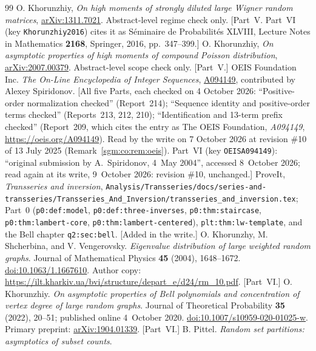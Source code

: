 \documentclass[11pt,letterpaper]{article}
\theoremstyle{remark}\newtheorem{remark}[theorem]{Remark}
\newcommand{\file}[1]{\nolinkurl{#1}}
\theoremstyle{definition}\newtheorem{definition}[theorem]{Definition}
\begin{document}
\begin{thebibliography}{99}
 O. Khorunzhiy, \emph{On high moments of strongly diluted large Wigner random matrices}, \href{https://arxiv.org/abs/1311.7021}{arXiv:1311.7021}. Abstract-level regime check only. [Part~V. Part~VI (key \texttt{Khorunzhiy2016}) cites it as S\'eminaire de Probabilit\'es XLVIII, Lecture Notes in Mathematics \textbf{2168}, Springer, 2016, pp.~347--399.]
 O. Khorunzhiy, \emph{On asymptotic properties of high moments of compound Poisson distribution}, \href{https://arxiv.org/abs/2007.00379}{arXiv:2007.00379}. Abstract-level scope check only. [Part~V.]
 OEIS Foundation Inc.
\emph{The On-Line Encyclopedia of Integer Sequences},
\href{https://oeis.org/A094149}{A094149}, contributed by Alexey Spiridonov.
[All five Parts, each checked on 4 October 2026: ``Positive-order normalization checked'' (Report~214); ``Sequence identity and positive-order terms checked'' (Reports~213, 212, 210); ``Identification and 13-term prefix checked'' (Report~209, which cites the entry as The OEIS Foundation, \emph{A094149}, \url{https://oeis.org/A094149}). Read by the write on 7 October 2026 at revision \#10 of 13 July 2025 (Remark~\ref{sgm:co:rem:oeis}). Part~VI (key \texttt{OEISA094149}): ``original submission by A.~Spiridonov, 4~May 2004'', accessed 8~October 2026; read again at its write, 9~October 2026: revision \#10, unchanged.]
 ProveIt, \emph{Transseries and inversion}, \file{Analysis/Transseries/docs/series-and-transseries/Transseries_And_Inversion/transseries_and_inversion.tex}; Part~0 (\file{p0:def:model}, \file{p0:def:three-inverses}, \file{p0:thm:staircase}, \file{p0:thm:lambert-core}, \file{p0:thm:lambert-centered}), \file{plt:thm:lw-template}, and the Bell chapter \file{q2:sec:bell}. [Added in the write.]
 O. Khorunzhy, M. Shcherbina, and V. Vengerovsky.
\emph{Eigenvalue distribution of large weighted random graphs}.
Journal of Mathematical Physics \textbf{45} (2004), 1648--1672.
\href{https://doi.org/10.1063/1.1667610}{doi:10.1063/1.1667610}.
Author copy: \url{https://ilt.kharkiv.ua/bvi/structure/depart_e/d24/rm_10.pdf}. [Part~VI.]
 O. Khorunzhiy.
\emph{On asymptotic properties of Bell polynomials and concentration of vertex degree of large random graphs}.
Journal of Theoretical Probability \textbf{35} (2022), 20--51; published online 4~October 2020.
\href{https://doi.org/10.1007/s10959-020-01025-w}{doi:10.1007/s10959-020-01025-w}.
Primary preprint: \href{https://arxiv.org/abs/1904.01339}{arXiv:1904.01339}. [Part~VI.]
 B. Pittel.
\emph{Random set partitions: asymptotics of subset counts}.

\end{thebibliography}
\end{document}
